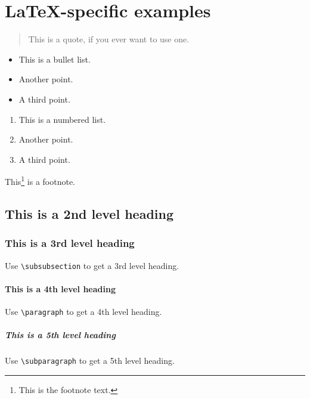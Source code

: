 \documentclass[draft]{OCR}
\begin{document}
\section{\LaTeX-specific examples}

\begin{quote}
This is a quote, if you ever want to use one. 
\end{quote}

\begin{itemize}
\item This is a bullet list.
\item Another point.
\item A third point.
\end{itemize}

\begin{enumerate}
\item This is a numbered list.
\item Another point.
\item A third point.
\end{enumerate}

This\footnote{This is the footnote text. } is a footnote.

\subsection{This is a 2nd level heading}

\subsubsection{This is a 3rd level heading}

Use \verb|\subsubsection| to get a 3rd level heading.

\paragraph{This is a 4th level heading}

Use \verb|\paragraph| to get a 4th level heading.

\subparagraph{This is a 5th level heading}

Use \verb|\subparagraph| to get a 5th level heading.
\end{document}
